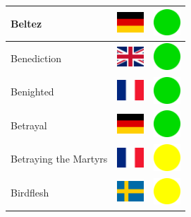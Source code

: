\documentclass[12pt, a4paper, twoside]{report}
\begin{document}
\begin{center}
\begin{longtable}{|p{5cm}|p{2cm}|p{2cm}|}
 Beltez                                                     & \includegraphics[width=1cm]{../4x3/de} &   \includegraphics[width=1cm]{../likes/y} \\ \hline
 Benediction                                                & \includegraphics[width=1cm]{../4x3/gb} &   \includegraphics[width=1cm]{../likes/y} \\ \hline
 Benighted                                                  & \includegraphics[width=1cm]{../4x3/fr} &   \includegraphics[width=1cm]{../likes/y} \\ \hline
 Betrayal                                                   & \includegraphics[width=1cm]{../4x3/de} &   \includegraphics[width=1cm]{../likes/y} \\ \hline
 Betraying the Martyrs                                      & \includegraphics[width=1cm]{../4x3/fr} &   \includegraphics[width=1cm]{../likes/m} \\ \hline
 Birdflesh                                                  & \includegraphics[width=1cm]{../4x3/se} &   \includegraphics[width=1cm]{../likes/m} \\ \hline

\end{longtable}
\end{center}
\end{document}
